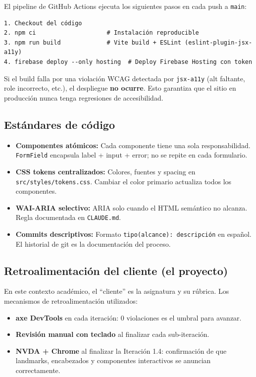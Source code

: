 \documentclass[12pt, a4paper]{article}
\begin{document}
El pipeline de GitHub Actions ejecuta los siguientes pasos en cada push a \texttt{main}:

\begin{lstlisting}[caption={Flujo de CI/CD --- .github/workflows/firebase-deploy.yml}]
1. Checkout del código
2. npm ci                    # Instalación reproducible
3. npm run build             # Vite build + ESLint (eslint-plugin-jsx-a11y)
4. firebase deploy --only hosting  # Deploy Firebase Hosting con token
\end{lstlisting}

Si el build falla por una violación WCAG detectada por \texttt{jsx-a11y} (alt faltante, role incorrecto, etc.), el despliegue \textbf{no ocurre}. Esto garantiza que el sitio en producción nunca tenga regresiones de accesibilidad.

\subsection{Estándares de código}

\begin{itemize}
  \item \textbf{Componentes atómicos:} Cada componente tiene una sola responsabilidad. \texttt{FormField} encapsula label + input + error; no se repite en cada formulario.
  \item \textbf{CSS tokens centralizados:} Colores, fuentes y spacing en \texttt{src/styles/tokens.css}. Cambiar el color primario actualiza todos los componentes.
  \item \textbf{WAI-ARIA selectivo:} ARIA solo cuando el HTML semántico no alcanza. Regla documentada en \texttt{CLAUDE.md}.
  \item \textbf{Commits descriptivos:} Formato \texttt{tipo(alcance): descripción} en español. El historial de git es la documentación del proceso.
\end{itemize}

\subsection{Retroalimentación del cliente (el proyecto)}

En este contexto académico, el ``cliente'' es la asignatura y su rúbrica. Los mecanismos de retroalimentación utilizados:
\begin{itemize}
  \item \textbf{axe DevTools} en cada iteración: 0 violaciones es el umbral para avanzar.
  \item \textbf{Revisión manual con teclado} al finalizar cada sub-iteración.
  \item \textbf{NVDA + Chrome} al finalizar la Iteración 1.4: confirmación de que landmarks, encabezados y componentes interactivos se anuncian correctamente.
\end{itemize}
\end{document}
